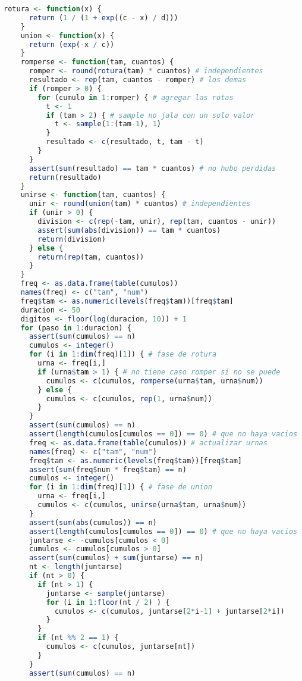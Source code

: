 \documentclass{article}
\begin{document}
\begin{lstlisting}[language=R, caption= Código para graficar el porcentaje de filtrado en cada iteración.]
    rotura <- function(x) {
      return (1 / (1 + exp((c - x) / d)))
    }
    union <- function(x) {
      return (exp(-x / c))
    }
    romperse <- function(tam, cuantos) {
      romper <- round(rotura(tam) * cuantos) # independientes
      resultado <- rep(tam, cuantos - romper) # los demas
      if (romper > 0) {
        for (cumulo in 1:romper) { # agregar las rotas
          t <- 1
          if (tam > 2) { # sample no jala con un solo valor
            t <- sample(1:(tam-1), 1)
          }
          resultado <- c(resultado, t, tam - t)
        }
      }
      assert(sum(resultado) == tam * cuantos) # no hubo perdidas
      return(resultado)
    }
    unirse <- function(tam, cuantos) {
      unir <- round(union(tam) * cuantos) # independientes
      if (unir > 0) {
        division <- c(rep(-tam, unir), rep(tam, cuantos - unir))
        assert(sum(abs(division)) == tam * cuantos)
        return(division)
      } else {
        return(rep(tam, cuantos))
      }
    }
    freq <- as.data.frame(table(cumulos))
    names(freq) <- c("tam", "num")
    freq$tam <- as.numeric(levels(freq$tam))[freq$tam]
    duracion <- 50
    digitos <- floor(log(duracion, 10)) + 1
    for (paso in 1:duracion) {
      assert(sum(cumulos) == n)
      cumulos <- integer()
      for (i in 1:dim(freq)[1]) { # fase de rotura
        urna <- freq[i,]
        if (urna$tam > 1) { # no tiene caso romper si no se puede
          cumulos <- c(cumulos, romperse(urna$tam, urna$num))
        } else {
          cumulos <- c(cumulos, rep(1, urna$num))
        }
      }
      assert(sum(cumulos) == n)
      assert(length(cumulos[cumulos == 0]) == 0) # que no haya vacios
      freq <- as.data.frame(table(cumulos)) # actualizar urnas
      names(freq) <- c("tam", "num")
      freq$tam <- as.numeric(levels(freq$tam))[freq$tam]
      assert(sum(freq$num * freq$tam) == n)
      cumulos <- integer()
      for (i in 1:dim(freq)[1]) { # fase de union
        urna <- freq[i,]
        cumulos <- c(cumulos, unirse(urna$tam, urna$num))
      }
      assert(sum(abs(cumulos)) == n)
      assert(length(cumulos[cumulos == 0]) == 0) # que no haya vacios
      juntarse <- -cumulos[cumulos < 0]
      cumulos <- cumulos[cumulos > 0]
      assert(sum(cumulos) + sum(juntarse) == n)
      nt <- length(juntarse)
      if (nt > 0) {
        if (nt > 1) {
          juntarse <- sample(juntarse)
          for (i in 1:floor(nt / 2) ) {
            cumulos <- c(cumulos, juntarse[2*i-1] + juntarse[2*i])
          }
        }
        if (nt %% 2 == 1) {
          cumulos <- c(cumulos, juntarse[nt])
        }
      }
      assert(sum(cumulos) == n)

\end{lstlisting}
\end{document}
